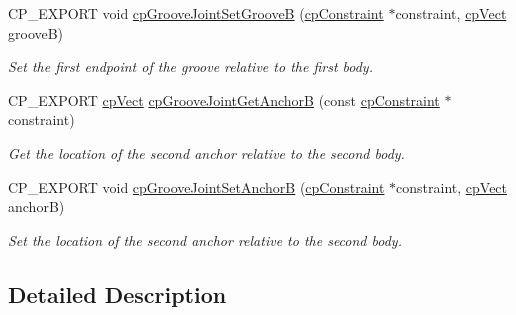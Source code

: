 \begin{DoxyCompactItemize}
\mbox{\label{group__cpGrooveJoint_ga56f0b4f7aff4eff68da2f60f1879b846}} 
C\+P\+\_\+\+E\+X\+P\+O\+RT void \hyperlink{group__cpGrooveJoint_ga56f0b4f7aff4eff68da2f60f1879b846}{cp\+Groove\+Joint\+Set\+GrooveB} (\hyperlink{structcpConstraint}{cp\+Constraint} $\ast$constraint, \hyperlink{structcpVect}{cp\+Vect} grooveB)
\begin{DoxyCompactList}\small\item\em Set the first endpoint of the groove relative to the first body. \end{DoxyCompactList}\item 
\mbox{\label{group__cpGrooveJoint_ga30f7cc8c845ad3c2b3b94602f4e21773}} 
C\+P\+\_\+\+E\+X\+P\+O\+RT \hyperlink{structcpVect}{cp\+Vect} \hyperlink{group__cpGrooveJoint_ga30f7cc8c845ad3c2b3b94602f4e21773}{cp\+Groove\+Joint\+Get\+AnchorB} (const \hyperlink{structcpConstraint}{cp\+Constraint} $\ast$constraint)
\begin{DoxyCompactList}\small\item\em Get the location of the second anchor relative to the second body. \end{DoxyCompactList}\item 
\mbox{\label{group__cpGrooveJoint_ga9c55eebb18491c9962956b1aae1f5777}} 
C\+P\+\_\+\+E\+X\+P\+O\+RT void \hyperlink{group__cpGrooveJoint_ga9c55eebb18491c9962956b1aae1f5777}{cp\+Groove\+Joint\+Set\+AnchorB} (\hyperlink{structcpConstraint}{cp\+Constraint} $\ast$constraint, \hyperlink{structcpVect}{cp\+Vect} anchorB)
\begin{DoxyCompactList}\small\item\em Set the location of the second anchor relative to the second body. \end{DoxyCompactList}\end{DoxyCompactItemize}


\subsection{Detailed Description}
